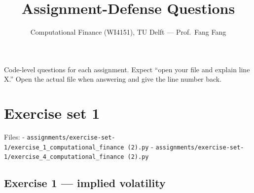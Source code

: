 \documentclass[
  11pt,
]{article}
\title{Assignment-Defense Questions}
\author{Computational Finance (WI4151), TU Delft --- Prof.~Fang Fang}
\date{}
\begin{document}
\maketitle

{
\hypersetup{linkcolor=blue}
\setcounter{tocdepth}{3}
\tableofcontents
}
Code-level questions for each assignment. Expect ``open your file and
explain line X.'' Open the actual file when answering and give the line
number back.

\hypertarget{exercise-set-1}{%
\section{Exercise set 1}\label{exercise-set-1}}

Files: -
\texttt{assignments/exercise-set-1/exercise\_1\_computational\_finance\ (2).py}
-
\texttt{assignments/exercise-set-1/exercise\_4\_computational\_finance\ (2).py}

\hypertarget{exercise-1-implied-volatility}{%
\subsection{Exercise 1 --- implied
volatility}\label{exercise-1-implied-volatility}}
\end{document}

